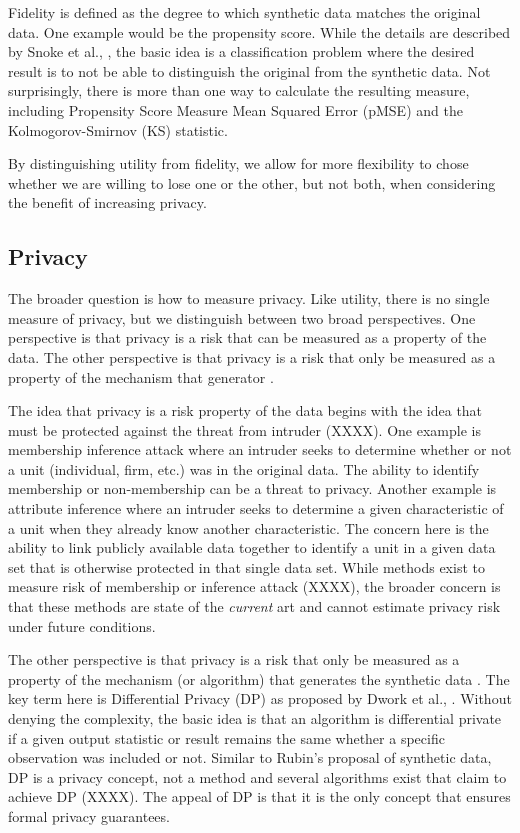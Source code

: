 \documentclass[runningheads]{llncs}
\begin{document}
Fidelity is defined as the degree to which synthetic data matches the original data.  One example would be the propensity score.  While the details are described by Snoke et al., \cite{snoke2018general}, the basic idea is a classification problem where the desired result is to not be able to distinguish the original from the synthetic data.  Not surprisingly, there is more than one way to calculate the resulting measure, including Propensity Score Measure Mean Squared Error (pMSE) \cite{woo2009global} and the Kolmogorov-Smirnov (KS) statistic.

By distinguishing utility from fidelity, we allow for more flexibility to chose whether we are willing to lose one or the other, but not both, when considering the benefit of increasing privacy.

\subsection{Privacy}

The broader question is how to measure privacy.  Like utility, there is no single measure of privacy, but we distinguish between two broad perspectives.  One perspective is that privacy is a risk that can be measured as a property of the data.  The other perspective is that privacy is a risk that only be measured as a property of the mechanism that generator \cite{jordon2022synthetic}.  

The idea that privacy is a risk property of the data begins with the idea that must be protected against the threat from intruder (XXXX).  One example is membership inference attack where an intruder seeks to determine whether or not a unit (individual, firm, etc.) was in the original data.  The ability to identify membership or non-membership can be a threat to privacy.  Another example is attribute inference where an intruder seeks to determine a given characteristic of a unit when they already know another characteristic.  The concern here is the ability to link publicly available data together to identify a unit in a given data set that is otherwise protected in that single data set.  While methods exist to measure risk of membership or inference attack (XXXX), the broader concern is that these methods are state of the \emph{current} art and cannot estimate privacy risk under future conditions.  

The other perspective is that privacy is a risk that only be measured as a property of the mechanism (or algorithm) that generates the synthetic data \cite{jordon2022synthetic}.  The key term here is Differential Privacy (DP) as proposed by Dwork et al., \cite{dwork2006calibrating}.  Without denying the complexity, the basic idea is that an algorithm is differential private if a given output statistic or result remains the same whether a specific observation was included or not.  Similar to Rubin's proposal of synthetic data, DP is a privacy concept, not a method and several algorithms exist that claim to achieve DP (XXXX).  The appeal of DP is that it is the only concept that ensures formal privacy guarantees.
\end{document}
